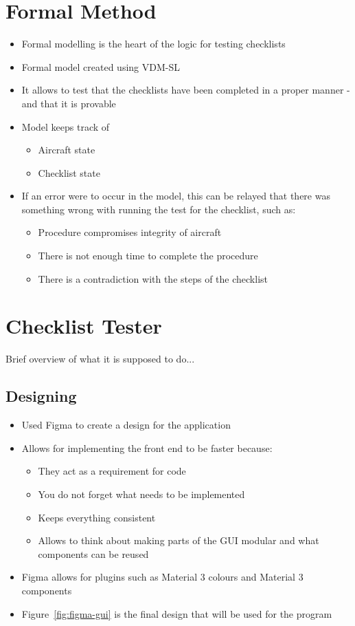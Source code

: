 \documentclass[../dissertation.tex]{subfiles}
\begin{document}
\section{Formal Method}
\begin{itemize}
  \item Formal modelling is the heart of the logic for testing checklists
  \item Formal model created using VDM-SL
  \item It allows to test that the checklists have been completed in a proper manner
    - and that it is provable
  \item Model keeps track of
    \begin{itemize}
      \item Aircraft state
      \item Checklist state
    \end{itemize}
  \item If an error were to occur in the model, this can be relayed that there was
    something wrong with running the test for the checklist, such as:
    \begin{itemize}
      \item Procedure compromises integrity of aircraft
      \item There is not enough time to complete the procedure
      \item There is a contradiction with the steps of the checklist
    \end{itemize}
\end{itemize}


\section{Checklist Tester}
Brief overview of what it is supposed to do... %

\subsection{Designing}
\begin{itemize}
  \item Used Figma to create a design for the application
  \item Allows for implementing the front end to be faster because:
    \begin{itemize}
      \item They act as a requirement for code
      \item You do not forget what needs to be implemented
      \item Keeps everything consistent
      \item Allows to think about making parts of the GUI modular and what components can be reused
    \end{itemize}
  \item Figma allows for plugins such as Material 3 colours and Material 3 components
  \item Figure~\ref{fig:figma-gui} is the final design that will be used for the
    program
\end{itemize}
\end{document}
